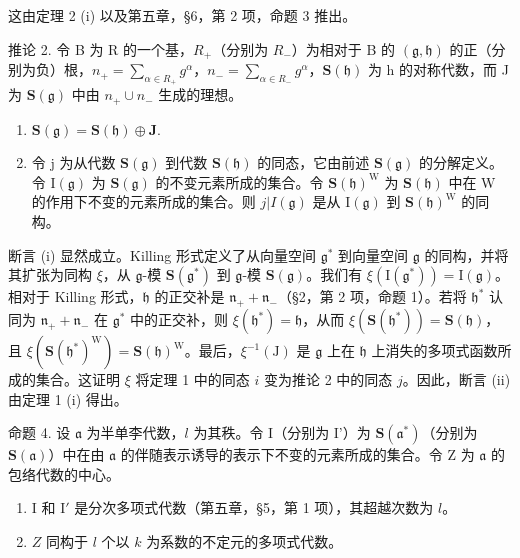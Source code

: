 这由定理 2 (i) 以及第五章，§6，第 2 项，命题 3 推出。

推论 2. 令 B 为 R 的一个基，\(R_{+}\)（分别为 \(R_{-}\)）为相对于 B 的 \((\mathfrak{g},\mathfrak{h})\) 的正（分别为负）根，\(n_{+}=\sum_{\alpha\in R_{+}}g^{\alpha}\)，\(n_{-}=\sum_{\alpha\in R_{-}}g^{\alpha}\)，\(\mathbf{S}(\mathfrak{h})\) 为 h 的对称代数，而 J 为 \(\mathbf{S}(\mathfrak{g})\) 中由 \(n_{+}\cup n_{-}\) 生成的理想。

\begin{enumerate}
\def\labelenumi{(\roman{enumi})}
\item
  \(\mathbf{S}(\mathfrak{g}) = \mathbf{S}(\mathfrak{h}) \oplus \mathbf{J}.\)
\item
令 j 为从代数 \(\mathbf{S}(\mathfrak{g})\) 到代数 \(\mathbf{S}(\mathfrak{h})\) 的同态，它由前述 \(\mathbf{S}(\mathfrak{g})\) 的分解定义。令 \(\mathrm{I}(\mathfrak{g})\) 为 \(\mathbf{S}(\mathfrak{g})\) 的不变元素所成的集合。令 \(\mathbf{S}(\mathfrak{h})^{\mathrm{W}}\) 为 \(\mathbf{S}(\mathfrak{h})\) 中在 W 的作用下不变的元素所成的集合。则 \(j|I(\mathfrak{g})\) 是从 \(\mathrm{I}(\mathfrak{g})\) 到 \(\mathbf{S}(\mathfrak{h})^{\mathrm{W}}\) 的同构。
\end{enumerate}

断言 (i) 显然成立。Killing 形式定义了从向量空间 \(\mathfrak{g}^*\) 到向量空间 \(\mathfrak{g}\) 的同构，并将其扩张为同构 \(\xi\)，从 \(\mathfrak{g}\)-模 \(\mathbf{S}(\mathfrak{g}^*)\) 到 \(\mathfrak{g}\)-模 \(\mathbf{S}(\mathfrak{g})\)。我们有 \(\xi (\mathrm{I}(\mathfrak{g}^*)) = \mathrm{I}(\mathfrak{g})\)。相对于 Killing 形式，\(\mathfrak{h}\) 的正交补是 \(\mathfrak{n}_{+} + \mathfrak{n}_{-}\)（§2，第 2 项，命题 1）。若将 \(\mathfrak{h}^*\) 认同为 \(\mathfrak{n}_{+} + \mathfrak{n}_{-}\) 在 \(\mathfrak{g}^*\) 中的正交补，则 \(\xi (\mathfrak{h}^*) = \mathfrak{h}\)，从而 \(\xi (\mathbf{S}(\mathfrak{h}^*)) = \mathbf{S}(\mathfrak{h})\)，且 \(\xi (\mathbf{S}(\mathfrak{h}^*)^{\mathrm{W}}) = \mathbf{S}(\mathfrak{h})^{\mathrm{W}}\)。最后，\(\xi^{-1}(\mathrm{J})\) 是 \(\mathfrak{g}\) 上在 \(\mathfrak{h}\) 上消失的多项式函数所成的集合。这证明 \(\xi\) 将定理 1 中的同态 \(i\) 变为推论 2 中的同态 \(j\)。因此，断言 (ii) 由定理 1 (i) 得出。

命题 4. 设 \(\mathfrak{a}\) 为半单李代数，\(l\) 为其秩。令 I（分别为 I'）为 \(\mathbf{S}(\mathfrak{a}^{*})\)（分别为 \(\mathbf{S}(\mathfrak{a})\)）中在由 \(\mathfrak{a}\) 的伴随表示诱导的表示下不变的元素所成的集合。令 Z 为 \(\mathfrak{a}\) 的包络代数的中心。

\begin{enumerate}
\def\labelenumi{(\roman{enumi})}
\item
  I 和 \(\mathrm{I}'\) 是分次多项式代数（第五章，§5，第 1 项），其超越次数为 \(l\)。
\item
  \(Z\) 同构于 \(l\) 个以 \(k\) 为系数的不定元的多项式代数。
\end{enumerate}

